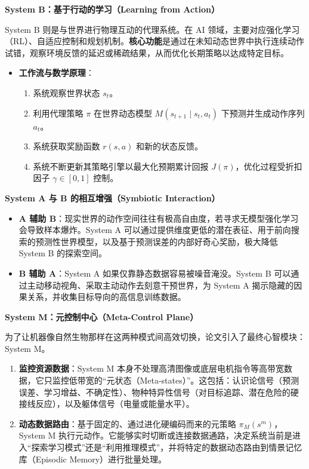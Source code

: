 \textbf{System B：基于行动的学习（Learning from Action）}

System B 则是与世界进行物理互动的代理系统。在 AI 领域，主要对应强化学习（RL）、自适应控制和规划机制。\textbf{核心功能}是通过在未知动态世界中执行连续动作试错，观察环境反馈的延迟或稀疏结果，从而优化长期策略以达成特定目标。

\begin{itemize}
\tightlist
\item
  \textbf{工作流与数学原理}：

  \begin{enumerate}
  \def\labelenumi{\arabic{enumi}.}
  \tightlist
  \item
    系统观察世界状态 \(s_t\)。
  \item
    利用代理策略 \(\pi\) 在世界动态模型 \(M(s_{t+1}\mid s_t,a_t)\) 下预测并生成动作序列 \(a_t\)。
  \item
    系统获取奖励函数 \(r(s,a)\) 和新的状态反馈。
  \item
    系统不断更新其策略引擎以最大化预期累计回报 \(J(\pi)\)，优化过程受折扣因子 \(\gamma\in[0,1]\) 控制。
  \end{enumerate}
\end{itemize}

\textbf{System A 与 B 的相互增强（Symbiotic Interaction）}

\begin{itemize}
\tightlist
\item
  \textbf{A 辅助 B}：现实世界的动作空间往往有极高自由度，若寻求无模型强化学习会导致样本爆炸。System A 可以通过提供维度更低的潜在表征、用于前向搜索的预测性世界模型，以及基于预测误差的内部好奇心奖励，极大降低 System B 的探索空间。
\item
  \textbf{B 辅助 A}：System A 如果仅靠静态数据容易被噪音淹没。System B 可以通过主动移动视角、采取主动动作去刻意干预世界，为 System A 揭示隐藏的因果关系，并收集目标导向的高信息训练数据。
\end{itemize}

\textbf{System M：元控制中心（Meta-Control Plane）}

为了让机器像自然生物那样在这两种模式间高效切换，论文引入了最终心智模块：System M。

\begin{enumerate}
\def\labelenumi{\arabic{enumi}.}
\tightlist
\item
  \textbf{监控资源数据}：System M 本身不处理高清图像或底层电机指令等高带宽数据，它只监控低带宽的``元状态（Meta-states）''。这包括：认识论信号（预测误差、学习增益、不确定性）、物种特异性信号（对目标追踪、潜在危险的硬接线反应），以及躯体信号（电量或能量水平）。
\item
  \textbf{动态数据路由}：基于固定的、通过进化硬编码而来的元策略 \(\pi_M(s^m)\)，System M 执行元动作。它能够实时切断或连接数据通路，决定系统当前是进入``探索学习模式''还是``利用推理模式''，并将特定的数据动态路由到情景记忆库（Episodic Memory）进行批量处理。
\end{enumerate}

